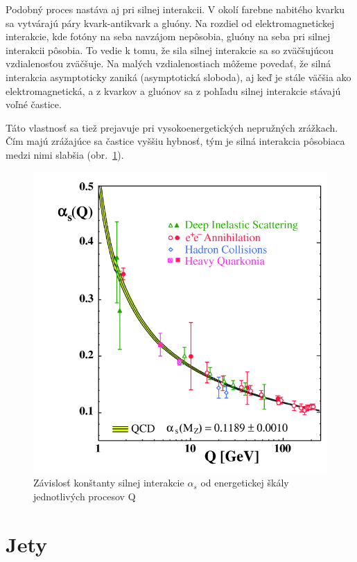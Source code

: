 \documentclass[thesismargins, thesislinespacing]{rnthesis}
\begin{document}
Podobný proces nastáva aj pri silnej interakcii. V okolí farebne nabitého kvarku sa vytvárajú páry kvark-antikvark a gluóny. Na rozdiel od elektromagnetickej interakcie, kde fotóny na seba navzájom nepôsobia, gluóny na seba pri silnej interakcii pôsobia. To vedie k tomu, že sila silnej interakcie sa so zväčšujúcou vzdialenosťou zväčšuje. Na malých vzdialenostiach môžeme povedať, že silná interakcia asymptoticky zaniká (asymptotická sloboda), aj keď je stále väčšia ako elektromagnetická, a z kvarkov a gluónov sa z pohľadu silnej interakcie stávajú voľné častice. 

Táto vlastnosť sa tiež prejavuje pri vysokoenergetických nepružných zrážkach. Čím majú zrážajúce sa častice vyššiu hybnosť, tým je silná interakcia pôsobiaca medzi nimi slabšia (obr.~\ref{alfa}).
\begin{figure}
	\centering
	\includegraphics[scale=0.4]{./Obrazky_praca/zrazka.png}
	\caption{Závislosť konštanty silnej interakcie $\alpha_s$ od energetickej škály jednotlivých procesov Q \cite{3}}
	\label{alfa}
\end{figure}




\section{Jety}
\end{document}
